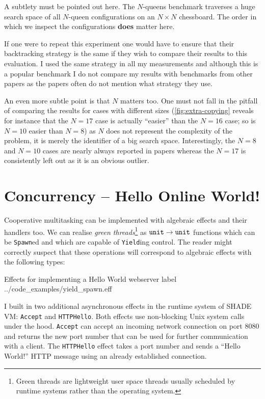 \documentclass[class=article, crop=false]{standalone}
\begin{document}
A subtlety must be pointed out here. The $N$-queens benchmark traverses a huge
search space of all $N$-queen configurations on an $N\times N$ chessboard. The
order in which we inspect the configurations \textbf{does} matter here.

If one were to repeat this experiment one would have to ensure that their
backtracking strategy is the same if they wish to compare their results to this
evaluation. I used the same strategy in all my measurements and although this is
a popular benchmark I do not compare my results with benchmarks from other papers
as the papers often do not mention what strategy they use.

An even more subtle point is that $N$ matters too. One must not fall in the pitfall
of comparing the results for cases with different sizes (\autoref{fig:extra-copying}
reveals for instance that the $N=17$ case is actually ``easier'' than the $N=16$
case; so is $N=10$ easier than $N=8$) as $N$ does not represent the complexity of the problem, it is merely the
identifier of a big search space. Interestingly, the $N=8$ and $N=10$ cases are
nearly always reported in papers whereas the $N=17$ is consistently left out as
it is an obvious outlier.

\section{Concurrency -- Hello Online World!}

Cooperative multitasking can be implemented with algebraic effects and their
handlers too. We can realise \emph{green threads}\footnote{Green threads are
lightweight user space threads usually scheduled by runtime systems rather
than the operating system.} as $\mathtt{unit} \to \mathtt{unit}$
functions which can be \lstinline|Spawn|ed and which are capable
of \lstinline|Yield|ing control. The reader might correctly suspect that
these operations will correspond to algebraic effects with the following types:

{Effects for implementing a Hello World webserver}
{label}
{../code_examples/yield_spawn.eff}

I built in two additional asynchronous effects in the runtime system of
SHADE VM: \verb|Accept| and \verb|HTTPHello|.
Both effects use non-blocking Unix system calls under the hood.
\verb|Accept| can accept an incoming network connection on port 8080 and returns
the new port number that can be used for further communication with a client.
The \verb|HTTPHello| effect takes a port number and sends a ``Hello World!''
HTTP message using an already established connection.
\end{document}
